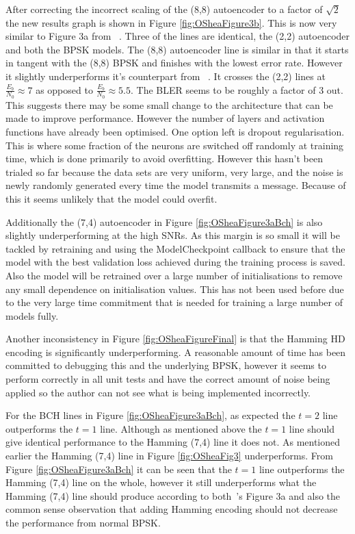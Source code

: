\documentclass[12pt,onecolumn,letterpaper]{article}
\begin{document}
After correcting the incorrect scaling of the (8,8) autoencoder to a factor of $\sqrt{2}$ the new results graph is shown in Figure \ref{fig:OSheaFigure3b}. This is now very similar to Figure 3a from ~\cite{oShea}. Three of the lines are identical, the (2,2) autoencoder and both the BPSK models. The (8,8) autoencoder line is similar in that it starts in tangent with the (8,8) BPSK and finishes with the lowest error rate. However it slightly underperforms it's counterpart from ~\cite{oShea}. It crosses the (2,2) lines at $\frac{E_b}{N_0}\approx7$ as opposed to $\frac{E_b}{N_0}\approx5.5$. The BLER seems to be roughly a factor of 3 out. This suggests there may be some small change to the architecture that can be made to improve performance. However the number of layers and activation functions have already been optimised. One option left is dropout regularisation. This is where some fraction of the neurons are switched off randomly at training time, which is done primarily to avoid overfitting. However this hasn't been trialed so far because the data sets are very uniform, very large, and the noise is newly randomly generated every time the model transmits a message. Because of this it seems unlikely that the model could overfit. 

Additionally the (7,4) autoencoder in Figure \ref{fig:OSheaFigure3aBch} is also slightly underperforming at the high SNRs. As this margin is so small it will be tackled by retraining and using the ModelCheckpoint callback to ensure that the model with the best validation loss achieved during the training process is saved. Also the model will be retrained over a large number of initialisations to remove any small dependence on initialisation values. This has not been used before due to the very large time commitment that is needed for training a large number of models fully. 

Another inconsistency in Figure \ref{fig:OSheaFigureFinal} is that the Hamming HD encoding is significantly underperforming. A reasonable amount of time has been committed to debugging this and the underlying BPSK, however it seems to perform correctly in all unit tests and have the correct amount of noise being applied so the author can not see what is being implemented incorrectly. 

For the BCH lines in Figure \ref{fig:OSheaFigure3aBch}, as expected the $t=2$ line outperforms the $t=1$ line. Although as mentioned above the $t=1$ line should give identical performance to the Hamming (7,4) line it does not. As mentioned earlier the Hamming (7,4) line in Figure \ref{fig:OSheaFig3} underperforms. From Figure \ref{fig:OSheaFigure3aBch} it can be seen that the $t=1$ line outperforms the Hamming (7,4) line on the whole, however it still underperforms what the Hamming (7,4) line should produce according to both~\cite{oShea}'s Figure 3a and also the common sense observation that adding Hamming encoding should not decrease the performance from normal BPSK.
\end{document}

